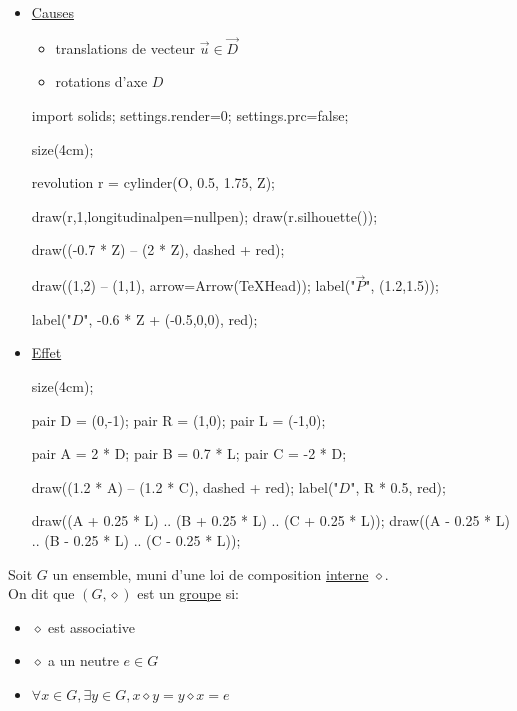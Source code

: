 \begin{itemize}
	\item \underline{Causes}
		\begin{itemize}
			\item translations de vecteur $\vec{u} \in \vec{D}$ 
			\item rotations d'axe $D$
		\end{itemize}

		\begin{center}
			\begin{asy}
				import solids;
				settings.render=0;
				settings.prc=false;

				size(4cm);

				revolution r = cylinder(O, 0.5, 1.75, Z);

				draw(r,1,longitudinalpen=nullpen);
				draw(r.silhouette());

				draw((-0.7 * Z) -- (2 * Z), dashed + red);

				draw((1,2) -- (1,1), arrow=Arrow(TeXHead));
				label("$\vec{P}$", (1.2,1.5));

				label("$D$", -0.6 * Z + (-0.5,0,0), red);
			\end{asy}
		\end{center}
		\vspace{2mm}

	\item \underline{Effet}
		\begin{center}
			\begin{asy}
				size(4cm);

				pair D = (0,-1);
				pair R = (1,0);
				pair L = (-1,0);

				pair A = 2 * D;
				pair B = 0.7 * L;
				pair C = -2 * D;

				draw((1.2 * A) -- (1.2 * C), dashed + red);
				label("$D$", R * 0.5, red);
				

				draw((A + 0.25 * L) .. (B + 0.25 * L) .. (C + 0.25 * L));
				draw((A - 0.25 * L) .. (B - 0.25 * L) .. (C - 0.25 * L));
			\end{asy}
		\end{center}
\end{itemize}

\begin{defn}
	Soit $G$ un ensemble, muni d'une loi de composition \underline{interne} $\diamond$.\\
	On dit que $\left( G, \diamond  \right) $ est un \underline{groupe} si:
	\begin{itemize}
		\item $\diamond $ est associative
		\item $\diamond$ a un neutre $e \in G$ 
		\item $\forall x \in G, \exists y \in G, x\diamond y = y \diamond x = e$
	\end{itemize}
\end{defn}

